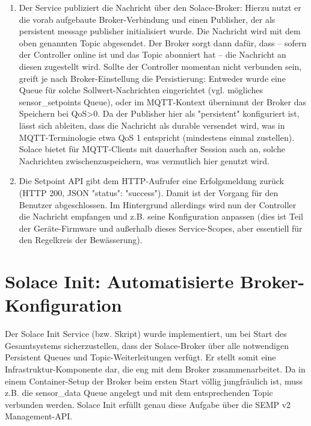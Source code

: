 \begin{enumerate}
    \item Der Service publiziert die Nachricht über den Solace-Broker: Hierzu nutzt er die vorab aufgebaute Broker-Verbindung und einen Publisher, der als persistent message publisher initialisiert wurde. Die Nachricht wird mit dem oben genannten Topic abgesendet. Der Broker sorgt dann dafür, dass – sofern der Controller online ist und das Topic abonniert hat – die Nachricht an diesen zugestellt wird. Sollte der Controller momentan nicht verbunden sein, greift je nach Broker-Einstellung die Persistierung: Entweder wurde eine Queue für solche Sollwert-Nachrichten eingerichtet (vgl. mögliches sensor\_setpoints Queue), oder im MQTT-Kontext übernimmt der Broker das Speichern bei QoS>0. Da der Publisher hier als "persistent" konfiguriert ist, lässt sich ableiten, dass die Nachricht als durable versendet wird, was in MQTT-Terminologie etwa QoS 1 entspricht (mindestens einmal zustellen). Solace bietet für MQTT-Clients mit dauerhafter Session auch an, solche Nachrichten zwischenzuspeichern, was vermutlich hier genutzt wird.
    \item Die Setpoint API gibt dem HTTP-Aufrufer eine Erfolgsmeldung zurück (HTTP 200, JSON {"status": "success"}). Damit ist der Vorgang für den Benutzer abgeschlossen. Im Hintergrund allerdings wird nun der Controller die Nachricht empfangen und z.B. seine Konfiguration anpassen (dies ist Teil der Geräte-Firmware und außerhalb dieses Service-Scopes, aber essentiell für den Regelkreis der Bewässerung).
\end{enumerate}

\section{Solace Init: Automatisierte Broker-Konfiguration}
Der Solace Init Service (bzw. Skript) wurde implementiert, um bei Start des Gesamtsystems sicherzustellen, dass der Solace-Broker über alle notwendigen Persistent Queues und Topic-Weiterleitungen verfügt. Er stellt somit eine Infrastruktur-Komponente dar, die eng mit dem Broker zusammenarbeitet. Da in einem Container-Setup der Broker beim ersten Start völlig jungfräulich ist, muss z.B. die sensor\_data Queue angelegt und mit dem entsprechenden Topic verbunden werden. Solace Init erfüllt genau diese Aufgabe über die SEMP v2 Management-API.
